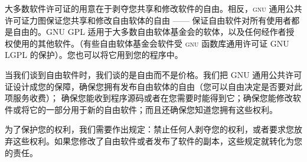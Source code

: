 
大多数软件许可证的用意在于剥夺您共享和修改软件的自由。相反，\textsc{gnu} 通用公共许可证力图保证您共享和修改自由软体的自由 —— 保证自由软件对所有使用者都是自由的。GNU GPL 适用于大多数自由软体基金会的软体，以及任何经作者授权使用的其他软件。（有些自由软体基金会软件受 \textsc{gnu} 函数库通用许可证 GNU LGPL 的保护）。您也可以将它用到您的程序中。


当我们谈到自由软件时，我们谈的是自由而不是价格。我们把 GNU 通用公共许可证设计成您的保障，确保您拥有发布自由软体的自由（您可以自由决定是否要对此项服务收费）； 确保您能收到程序源码或者在您需要时能得到它；确保您能修改软件或将它的一部分用于新的自由软件；而且还确保您知道您拥有这些权利。


为了保护您的权利，我们需要作出规定：禁止任何人剥夺您的权利，或者要求您放弃这些权利。如果您修改了自由软件或者发布了软件的副本，这些规定就转化为您的责任。


